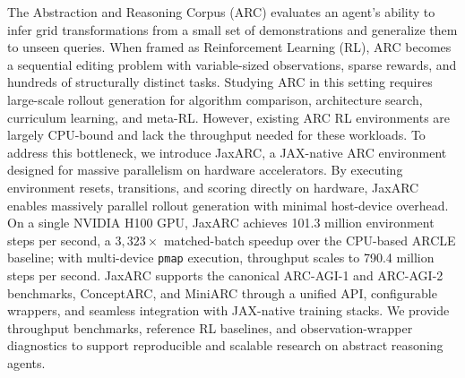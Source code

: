 The Abstraction and Reasoning Corpus (ARC) evaluates an agent's ability to infer grid transformations from a small set of demonstrations and generalize them to unseen queries. When framed as Reinforcement Learning (RL), ARC becomes a sequential editing problem with variable-sized observations, sparse rewards, and hundreds of structurally distinct tasks. Studying ARC in this setting requires large-scale rollout generation for algorithm comparison, architecture search, curriculum learning, and meta-RL. However, existing ARC RL environments are largely CPU-bound and lack the throughput needed for these workloads. To address this bottleneck, we introduce JaxARC, a JAX-native ARC environment designed for massive parallelism on hardware accelerators. By executing environment resets, transitions, and scoring directly on hardware, JaxARC enables massively parallel rollout generation with minimal host-device overhead. On a single NVIDIA H100 GPU, JaxARC achieves 101.3 million environment steps per second, a $3{,}323\times$ matched-batch speedup over the CPU-based ARCLE baseline; with multi-device \texttt{pmap} execution, throughput scales to 790.4 million steps per second. JaxARC supports the canonical ARC-AGI-1 and ARC-AGI-2 benchmarks, ConceptARC, and MiniARC through a unified API, configurable wrappers, and seamless integration with JAX-native training stacks. We provide throughput benchmarks, reference RL baselines, and observation-wrapper diagnostics to support reproducible and scalable research on abstract reasoning agents.
